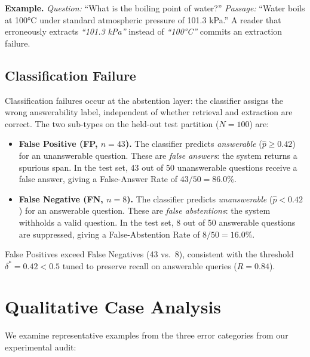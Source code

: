 \noindent \textbf{Example.} \textit{Question:} ``What is the boiling point of
water?'' \textit{Passage:} ``Water boils at 100°C under standard atmospheric
pressure of 101.3 kPa.'' A reader that erroneously extracts \textit{``101.3
kPa''} instead of \textit{``100°C''} commits an extraction failure.

\subsection{Classification Failure}
\label{sec:err_classification}

Classification failures occur at the abstention layer: the classifier assigns
the wrong answerability label, independent of whether retrieval and extraction
are correct. The two sub-types on the held-out test partition ($N=100$) are:

\begin{itemize}
  \item \textbf{False Positive (FP, $n=43$).} The classifier predicts
        \emph{answerable} ($\hat{p} \geq 0.42$) for an unanswerable question.
        These are \emph{false answers}: the system returns a spurious span.
        In the test set, 43 out of 50 unanswerable questions receive a
        false answer, giving a False-Answer Rate of $43/50 = 86.0\%$.

  \item \textbf{False Negative (FN, $n=8$).} The classifier predicts
        \emph{unanswerable} ($\hat{p} < 0.42$) for an answerable question.
        These are \emph{false abstentions}: the system withholds a valid
        question. In the test set, 8 out of 50 answerable questions are
        suppressed, giving a False-Abstention Rate of $8/50 = 16.0\%$.
\end{itemize}

False Positives exceed False Negatives (43 vs.\ 8),
consistent with the threshold $\delta^* = 0.42 < 0.5$ tuned to preserve
recall on answerable queries ($R = 0.84$).

\section{Qualitative Case Analysis}
\label{sec:err_cases}

We examine representative examples from the three error categories from our experimental audit:

